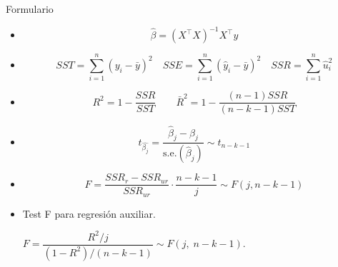 \documentclass[10pt,a4paper]{article}
\begin{document}




\newpage


\begin{center}
    {\Large Formulario  }

 
\end{center}

\begin{itemize}


\item  {\color{red} \[ \hat{\beta} = (X^{\top}X)^{-1}X^{\top}y \]}

\item 
	{\color{red}	\[ SST = \sum_{i=1}^{n} (y_i - \bar{y})^2 \quad SSE = \sum_{i=1}^{n} (\hat{y}_i - \bar{y})^2  \quad SSR = \sum_{i=1}^{n} \hat{u}_i^2\]}
		

    \item {\color{red} \[ R^2  = 1 - \frac{SSR}{SST} \quad \quad \bar{R}^2 =  1 - \frac{(n-1)SSR}{(n-k-1)SST} \]}

 \item {\color{red} \[ t_{\hat{\beta_j}}=\frac{\hat{\beta}_j - \beta_j}{\text{s.e.}(\hat{\beta}_j)} \sim t_{n-k-1} \]}

 \item {\color{red}\[
    F = \frac{SSR_{r} - SSR_{ur}}{SSR_{ur}} \cdot \frac{n - k - 1}{j} \sim F(j, n - k - 1)
    \]}

\item {\color{red}Test F para regresión auxiliar.}
\begin{center}
 {  \color{red}     \(F=\dfrac{R^{2}/j}{(1-R^{2})/(n-k-1)}
          \sim F(j,\;n-k-1)\).}
\end{center}



\end{itemize}
\end{document}
